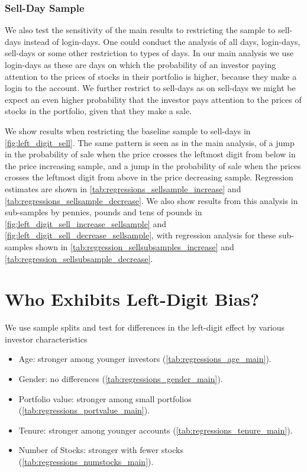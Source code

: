 \subsubsection{Sell-Day Sample}

We also test the sensitivity of the main results to restricting the sample to sell-days instead of login-days. One could conduct the analysis of all days, login-days, sell-days or some other restriction to types of days. In our main analysis we use login-days as these are days on which the probability of an investor paying attention to the prices of stocks in their portfolio is higher, because they make a login to the account. We further restrict to sell-days as on sell-days we might be expect an even higher probability that the investor pays attention to the prices of stocks in the portfolio, given that they make a sale.

We show results when restricting the baseline sample to sell-days in  \ref{fig:left_digit_sell}. The same pattern is seen as in the main analysis, of a jump in the probability of sale when the price crosses the leftmost digit from below in the price increasing sample, and a jump in the probability of sale when the prices crosses the leftmost digit from above in the price decreasing sample. Regression estimates are shown in \ref{tab:regressions_sellsample_increase} and \ref{tab:regressions_sellsample_decrease}. We also show results from this analysis in sub-samples by pennies, pounds and tens of pounds in \ref{fig:left_digit_sell_increase_sellsample} and \ref{fig:left_digit_sell_decrease_sellsample}, with regression analysis for these sub-samples shown in \ref{tab:regression_sellsubsamples_increase} and \ref{tab:regression_sellsubsample_decrease}.

\section{Who Exhibits Left-Digit Bias?} 

We use sample splits and test for differences in the left-digit effect by various investor characteristics
\begin{itemize}
	\item Age: stronger among younger investors (\ref{tab:regressions_age_main}).
	\item Gender: no differences (\ref{tab:regressions_gender_main}).
	\item Portfolio value: stronger among small portfolios (\ref{tab:regressions_portvalue_main}).
	\item Tenure: stronger among younger accounts (\ref{tab:regressions_tenure_main}).
	\item Number of Stocks: stronger with fewer stocks (\ref{tab:regressions_numstocks_main}).
\end{itemize}




